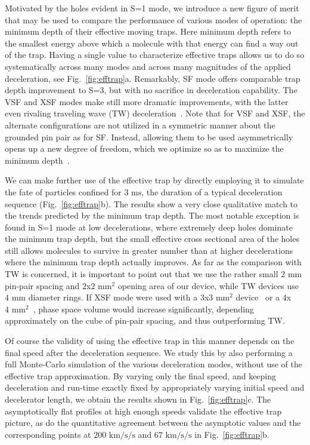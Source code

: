 \documentclass[%
 reprint,
 amsmath,amssymb,
 aps,
prl,
]{revtex4-1}
\begin{document}
Motivated by the holes evident in S=1 mode, we introduce a new figure of merit that may be used to compare the performance of various modes of operation: the minimum depth of their effective moving traps.
Here minimum depth refers to the smallest energy above which a molecule with that energy can find a way out of the trap.
Having a single value to characterize effective traps allows us to do so systematically across many modes and across many magnitudes of the applied deceleration, see Fig.~\ref{fig:efftrap}a. Remarkably, SF mode offers comparable trap depth improvement to S=3, but with no sacrifice in deceleration capability. 
The VSF and XSF modes make still more dramatic improvements, with the latter even rivaling traveling wave (TW) deceleration~\cite{Osterwalder2010}. 
Note that for VSF and XSF, the alternate configurations are not utilized in a symmetric manner about the grounded pin pair as for SF. 
Instead, allowing them to be used asymmetrically opens up a new degree of freedom, which we optimize so as to maximize the minimum depth~\cite{ssm}.

We can make further use of the effective trap by directly employing it to simulate the fate of particles confined for $3\text{ ms}$, the duration of a typical deceleration sequence (Fig.~\ref{fig:efftrap}b). 
The results show a very close qualitative match to the trends predicted by the minimum trap depth. 
The most notable exception is found in S=1 mode at low decelerations, where extremely deep holes dominate the minimum trap depth, but the small effective cross sectional area of the holes still allows molecules to survive in greater number than at higher decelerations where the minimum trap depth actually improves.
As far as the comparison with TW is concerned, it is important to point out that we use the rather small $2\text{ mm}$ pin-pair spacing and $2$x$2\text{ mm}^2$ opening area of our device, while TW devices use $4\text{ mm}$ diameter rings.
If XSF mode were used with a $3$x$3\text{ mm}^2$ device~\cite{Scharfenberg2009} or a $4$x$4\text{ mm}^2$~\cite{VandeMeerakker2005}, phase space volume would increase significantly, depending approximately on the cube of pin-pair spacing, and thus outperforming TW. 

Of course the validity of using the effective trap in this manner depends on the final speed after the deceleration sequence.
We study this by also performing a full Monte-Carlo simulation of the various deceleration modes, without use of the effective trap approximation.
By varying only the final speed, and keeping deceleration and run-time exactly fixed by appropriately varying initial speed and decelerator length, we obtain the results shown in Fig.~\ref{fig:efftrap}c. 
The asymptotically flat profiles at high enough speeds validate the effective trap picture, as do the quantitative agreement between the asymptotic values and the corresponding points at $200\text{ km/s/s}$ and $67\text{ km/s/s}$ in Fig.~\ref{fig:efftrap}b. 
\end{document}
